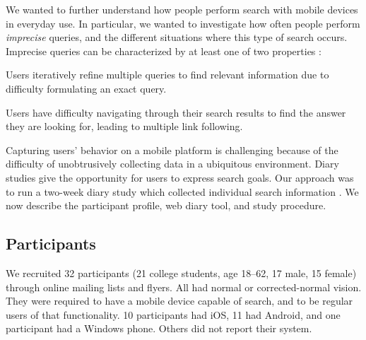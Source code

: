 


We wanted to further understand how people perform search with mobile devices in everyday use. In particular, we wanted to investigate how often people perform \textit{imprecise} queries, and the different situations where this type of search occurs. Imprecise queries can be characterized by at least one of two properties \cite{Lee:2012}: 
\begin{tight_enumerate}
\item Users iteratively refine multiple queries to find relevant information due to difficulty formulating an exact query. 
\item Users have difficulty navigating through their search results to find the answer they are looking for, leading to multiple link following.
\end{tight_enumerate}

Capturing users' behavior on a mobile platform is challenging because of the difficulty of unobtrusively collecting data in a ubiquitous environment. Diary studies give
the opportunity for users to express search goals. Our approach was to run a two-week diary study which collected individual search information \cite{Sohn:2008}. We now describe the participant profile, web diary tool, and study procedure.

\subsection{Participants}
We recruited 32 participants (21 college students, age 18--62, 17 male, 15 female) through online mailing lists and flyers. All had normal or corrected-normal vision. They were required to have a mobile device capable of search, and to be regular users of that functionality. 10 participants had iOS, 11 had Android, and one participant had a Windows phone. Others did not report their system.


